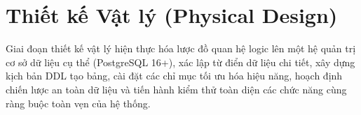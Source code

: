 \chapter{Thiết kế Vật lý (Physical Design)}
\label{chap:chuong3_vat_ly}

Giai đoạn thiết kế vật lý hiện thực hóa lược đồ quan hệ logic lên một hệ quản trị cơ sở dữ liệu cụ thể (PostgreSQL 16+), xác lập từ điển dữ liệu chi tiết, xây dựng kịch bản DDL tạo bảng, cài đặt các chỉ mục tối ưu hóa hiệu năng, hoạch định chiến lược an toàn dữ liệu và tiến hành kiểm thử toàn diện các chức năng cùng ràng buộc toàn vẹn của hệ thống.







